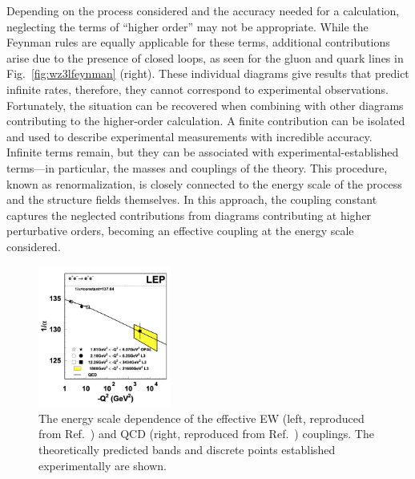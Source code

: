 Depending on the process considered and the accuracy needed for a calculation,
neglecting the terms of ``higher order'' may not be appropriate. While the 
Feynman rules are equally applicable for these terms, additional contributions
arise due to the presence of closed loops, as seen for the gluon and quark lines
in Fig.~\ref{fig:wz3lfeynman} (right). These individual diagrams give results
that predict infinite rates, therefore, they cannot correspond to experimental observations.
Fortunately, the situation can be recovered when combining with other diagrams
contributing to the higher-order calculation. A finite contribution can be
isolated and used to describe experimental measurements with incredible accuracy.
Infinite terms remain, but they can be associated with experimental-established
terms---in particular, the masses and couplings of the theory. This procedure,
known as renormalization, is closely connected to the energy scale of the process
and the structure fields themselves. In this approach, the coupling constant 
captures the neglected contributions from diagrams contributing at higher perturbative orders,
becoming an effective coupling at the energy scale considered.

\begin{figure}[htbp]
  \centering
   \includegraphics[width=0.39\textwidth]{figures/Phenomenology/alphaRunning.png}
  \caption[The energy scale dependence of the effective EW and QCD couplings]{
    The energy scale dependence of the effective EW (left, reproduced from Ref.~\cite{Mele:2006ji}) 
    and QCD (right, reproduced from Ref.~\cite{Tanabashi:2018oca}) couplings. The theoretically
    predicted bands and discrete points established experimentally are shown.
  }
\end{figure}

